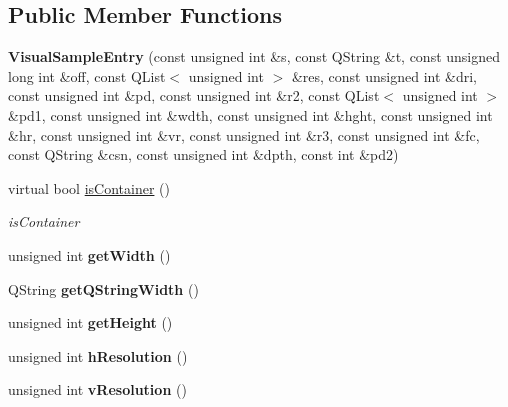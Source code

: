 \subsection*{Public Member Functions}
\begin{DoxyCompactItemize}
\item 
\hypertarget{class_visual_sample_entry_a7562620c9fecdb58c41da6ac2e322fbd}{{\bfseries Visual\-Sample\-Entry} (const unsigned int \&s, const Q\-String \&t, const unsigned long int \&off, const Q\-List$<$ unsigned int $>$ \&res, const unsigned int \&dri, const unsigned int \&pd, const unsigned int \&r2, const Q\-List$<$ unsigned int $>$ \&pd1, const unsigned int \&wdth, const unsigned int \&hght, const unsigned int \&hr, const unsigned int \&vr, const unsigned int \&r3, const unsigned int \&fc, const Q\-String \&csn, const unsigned int \&dpth, const int \&pd2)}\label{class_visual_sample_entry_a7562620c9fecdb58c41da6ac2e322fbd}

\item 
virtual bool \hyperlink{class_visual_sample_entry_a212a8d19ecf3236a8951c0161a85a72d}{is\-Container} ()
\begin{DoxyCompactList}\small\item\em is\-Container \end{DoxyCompactList}\item 
\hypertarget{class_visual_sample_entry_a0e83bd9b524461e138d6b011e7715101}{unsigned int {\bfseries get\-Width} ()}\label{class_visual_sample_entry_a0e83bd9b524461e138d6b011e7715101}

\item 
\hypertarget{class_visual_sample_entry_ae7a024ddbbde30e79520573e581d09b8}{Q\-String {\bfseries get\-Q\-String\-Width} ()}\label{class_visual_sample_entry_ae7a024ddbbde30e79520573e581d09b8}

\item 
\hypertarget{class_visual_sample_entry_a05718fa0fba5518bc2327239fd76b389}{unsigned int {\bfseries get\-Height} ()}\label{class_visual_sample_entry_a05718fa0fba5518bc2327239fd76b389}

\item 
\hypertarget{class_visual_sample_entry_a184681441a3744e4bfc6a586da212673}{unsigned int {\bfseries h\-Resolution} ()}\label{class_visual_sample_entry_a184681441a3744e4bfc6a586da212673}

\item 
\hypertarget{class_visual_sample_entry_ad2aed084f5850856e87782012976b5dd}{unsigned int {\bfseries v\-Resolution} ()}\label{class_visual_sample_entry_ad2aed084f5850856e87782012976b5dd}


\end{DoxyCompactItemize}
